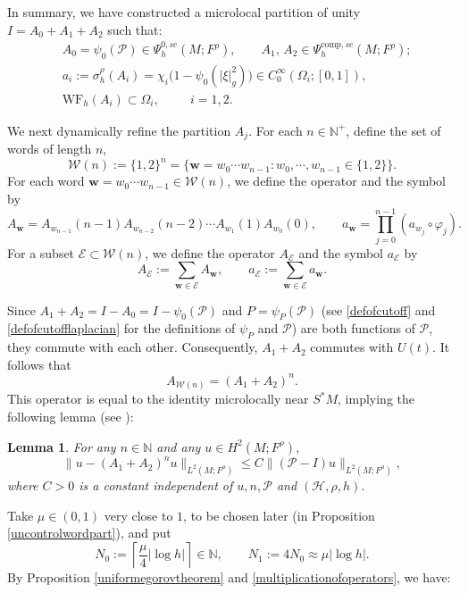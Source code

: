 \documentclass[11pt,oneside,reqno]{amsart}
\newcommand\N{\ensuremath{\mathbb{N}}}
\newtheorem{lemma}[theorem]{Lemma}
\theoremstyle{definition}
\numberwithin{equation}{section}
\theoremstyle{plain}
\begin{document}
In summary, we have constructed a microlocal partition of unity $I=A_0+A_1+A_2$ such that:
\begin{equation}\label{microlocalpartition}
\begin{aligned}
&A_{0}=\psi_0 (\mathcal{P}) \in \Psi^{0,sc}_h(M;F^\rho), \qquad A_{1}, \, A_{2} \in \Psi^{\mathrm{comp},sc}_h(M;F^\rho);\\
&a_{i}:=\sigma^{\rho}_{h}(A_{i})=\chi_{i}\big(1-\psi_0(|\xi|^2_g)\big)\in C_{0}^{\infty}(\Omega_{i};[0,1]),\\
&\mathrm{WF}_h(A_i)\subset \Omega_{i} , \qquad \ \ i=1,2. 
\end{aligned}
\end{equation}

We next dynamically refine the partition $A_j$. For each $n \in \mathbb{N}^+$, define the set of words of length $n$,
$$
\mathcal{W}(n):=\{1,2\}^n=\big\{\mathbf{w}=w_0 \cdots w_{n-1} :w_0, \cdots, w_{n-1} \in\{1,2\}\big\} .
$$
For each word $\mathbf{w}=w_0 \cdots w_{n-1} \in \mathcal{W}(n)$, we define the operator and the symbol by
\begin{equation}\label{defoflongword}
A_{\mathbf{w}}=A_{w_{n-1}}(n-1) A_{w_{n-2}}(n-2) \cdots A_{w_1}(1) A_{w_0}(0), \qquad a_{\mathbf{w}}=\prod_{j=0}^{n-1}\left(a_{w_j} \circ \varphi_j\right).
\end{equation}
For a subset $\mathcal{E} \subset \mathcal{W}(n)$, we define the operator $A_{\mathcal{E}}$ and the symbol $a_{\mathcal{E}}$ by
\begin{equation*}
    A_{\mathcal{E}}:=\sum_{\mathbf{w} \in \mathcal{E}} A_{\mathbf{w}}, \qquad a_{\mathcal{E}}:=\sum_{\mathbf{w} \in \mathcal{E}} a_{\mathbf{w}} .
\end{equation*}

Since $A_1+A_2=I-A_0=I-\psi_0 (\mathcal{P})$ and $P=\psi_P(\mathcal{P})$ (see \eqref{defofcutoff} and \eqref{defofcutofflaplacian} for the definitions of $\psi_P$ and $\mathcal{P}$) are both functions of $\mathcal{P}$, they commute with each other. Consequently, $A_1+A_2$ commutes with $U(t)$. It follows that
\begin{equation*}
    A_{\mathcal{W}(n)}=\left(A_1+A_2\right)^n.
\end{equation*}
This operator is equal to the identity microlocally near $S^*M$, implying the following lemma (see \cite[Lemma 3.1]{dyatlov2018semiclassical}):
\begin{lemma}\label{awayfromcosphere}
For any $n\in \N$ and any $u \in H^2(M;F^{\rho})$,
\begin{equation}
\|u-(A_1+A_2)^n u\|_{L^2(M;F^\rho)} \leq C\|(\mathcal{P}-I) u\|_{L^2(M;F^\rho)} ,
\end{equation}
where $C>0$ is a constant independent of $u,n,\mathcal{P}$ and $(\mathcal{H},\rho,h)$.
\end{lemma}
Take $\mu \in (0,1)$ very close to $1$, to be chosen later (in Proposition \ref{uncontrolwordpart}), and put
\begin{equation*}
    N_0:=\left\lceil\frac{\mu}{4} |\log h|\right\rceil \in \mathbb{N}, \qquad N_1:=4 N_0 \approx \mu |\log h|.
\end{equation*}
By Proposition \ref{uniformegorovtheorem} and \ref{multiplicationofoperators}, we have:
\end{document}
